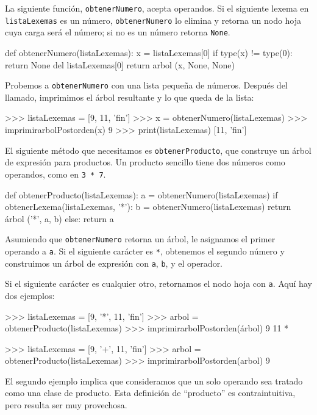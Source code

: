 La siguiente función, \texttt{obtenerNumero}, acepta operandos. Si
el siguiente lexema en \texttt{listaLexemas} es un número, \texttt{obtenerNumero}
lo elimina y retorna un nodo hoja cuya carga será el número; si no
es un número retorna \texttt{None}.

\beforeverb 
\begin{pythoncode}
def obtenerNumero(listaLexemas):
  x = listaLexemas[0]
  if type(x) != type(0): 
     return None
  del listaLexemas[0]
  return arbol (x, None, None)
\end{pythoncode}
\afterverb Probemos a \texttt{obtenerNumero} con una lista pequeña
de números. Después del llamado, imprimimos el árbol resultante y
lo que queda de la lista:

\beforeverb 
\begin{pyconcode}
>>> listaLexemas = [9, 11, 'fin']
>>> x = obtenerNumero(listaLexemas)
>>> imprimirarbolPostorden(x)
9
>>> print(listaLexemas)
[11, 'fin']
\end{pyconcode}
\afterverb El siguiente método que necesitamos es \texttt{obtenerProducto},
que construye un árbol de expresión para productos. Un producto sencillo
tiene dos números como operandos, como en \texttt{3 {*} 7}.

\beforeverb 
\begin{pythoncode}
def obtenerProducto(listaLexemas):
  a = obtenerNumero(listaLexemas)
  if obtenerLexema(listaLexemas, '*'):
    b = obtenerNumero(listaLexemas)
    return árbol ('*', a, b)
  else:
    return a
\end{pythoncode}
\afterverb Asumiendo que \texttt{obtenerNumero} retorna un árbol,
le asignamos el primer operando a \texttt{a}. Si el siguiente carácter
es \texttt{{*}}, obtenemos el segundo número y construimos un árbol
de expresión con \texttt{a}, \texttt{b}, y el operador.

Si el siguiente carácter es cualquier otro, retornamos el nodo hoja
con \texttt{a}. Aquí hay dos ejemplos:

\beforeverb 
\begin{pyconcode}
>>> listaLexemas = [9, '*', 11, 'fin']
>>> arbol = obtenerProducto(listaLexemas)
>>> imprimirarbolPostorden(árbol)
9 11 *
\end{pyconcode}
\afterverb

\beforeverb 
\begin{pyconcode}
>>> listaLexemas = [9, '+', 11, 'fin']
>>> arbol = obtenerProducto(listaLexemas)
>>> imprimirarbolPostorden(arbol)
9
\end{pyconcode}
\afterverb El segundo ejemplo implica que consideramos que un solo
operando sea tratado como una clase de producto. Esta definición de
``producto'' es contraintuitiva, pero resulta ser muy provechosa.

